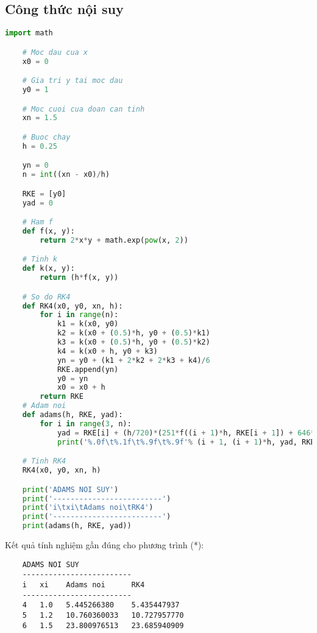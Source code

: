 \subsection{Công thức nội suy}
\begin{lstlisting}[language=Python]
	import math

	# Moc dau cua x
	x0 = 0

	# Gia tri y tai moc dau
	y0 = 1

	# Moc cuoi cua doan can tinh
	xn = 1.5

	# Buoc chay
	h = 0.25

	yn = 0
	n = int((xn - x0)/h)

	RKE = [y0]
	yad = 0

	# Ham f
	def f(x, y):
	    return 2*x*y + math.exp(pow(x, 2))

	# Tinh k
	def k(x, y):
		return (h*f(x, y))

	# So do RK4
	def RK4(x0, y0, xn, h):
	    for i in range(n):
	        k1 = k(x0, y0)
	        k2 = k(x0 + (0.5)*h, y0 + (0.5)*k1)
	        k3 = k(x0 + (0.5)*h, y0 + (0.5)*k2)
	        k4 = k(x0 + h, y0 + k3)
	        yn = y0 + (k1 + 2*k2 + 2*k3 + k4)/6
	        RKE.append(yn)
	        y0 = yn
	        x0 = x0 + h
	    return RKE
	# Adam noi
	def adams(h, RKE, yad):
		for i in range(3, n):
			yad = RKE[i] + (h/720)*(251*f((i + 1)*h, RKE[i + 1]) + 646*f(i*h, RKE[i]) - 264*f((i - 1)*h, RKE[i - 1]) + 106*f((i - 2)*h, RKE[i - 2]) - 19*f((i - 3)*h, RKE[i - 3]))
			print('%.0f\t%.1f\t%.9f\t%.9f'% (i + 1, (i + 1)*h, yad, RKE[i + 1]))

	# Tinh RK4
	RK4(x0, y0, xn, h)

	print('ADAMS NOI SUY')
	print('-------------------------')    
	print('i\txi\tAdams noi\tRK4')
	print('-------------------------')
	print(adams(h, RKE, yad))
\end{lstlisting}

Kết quả tính nghiệm gần đúng cho phương trình (*):
\begin{lstlisting}
	ADAMS NOI SUY
	-------------------------
	i   xi    Adams noi      RK4
	-------------------------
	4   1.0   5.445266380    5.435447937
	5   1.2   10.760360033   10.727957770
	6   1.5   23.800976513   23.685940909
\end{lstlisting}

